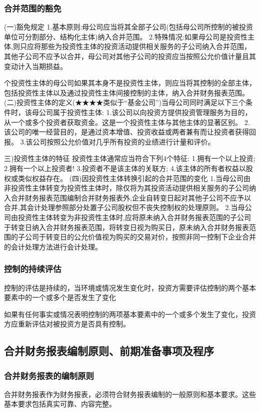 \documentclass[UTF8,12pt]{ctexart}
\numberwithin{equation}{section} %
\numberwithin{figure}{section}
\numberwithin{table}{section}
\begin{document}
	\subsubsection{合并范围的豁免}
	(一)豁免规定
	1.基本原则:母公司应当将其全部子公司(包括母公司所控制的被投资单位可分割部分、结构化主体)纳入合并范围。
	2.特殊情况:如果母公司是投资性主体,则只应将那些为投资性主体的投资活动提供相关服务的子公司纳入合并范围，其他子公司不应予以合并，母公司对其他子公司的投资应当按照公允价值计量且其变动计入当期损益。
	
	个投资性主体的母公司如果其本身不是投资性主体，则应当将其控制的全部主体，包括投资性主体以及通过投资性主体间接控制的主体，纳入合并财务报表范围。
	(二)投资性主体的定义(★★★★类似于“基金公司”)当母公司同时满足以下三个条件时，该母公司属于投资性主体:
	1.该公司以向投资方提供投资管理服务为目的，从一个或多个投资者获取资金。这是一个投资性主体与其他主体的显著区别。
	2.该公司的唯一经营目的，是通过资本增值、投资收益或两者兼有而让投资者获得回报。
	3.该公司按照公允价值对几乎所有投资的业绩进行计量和评价。
	
	三)投资性主体的特征
	投资性主体通常应当符合下列4个特征:
	1.拥有一个以上投资;
	2.拥有一个以上投资者!
	3.投资者不是该主体的关联方;
	4.该主体的所有者权益以股权或类似权益存在。
	(四)因投资性主体转换引起的合并范围的变化
	1.当母公司由非投资性主体转变为投资性主体时，除仅将为其投资活动提供相关服务的子公司纳入合并财务报表范围编制合并财务报表外,企业自转变日起对其他子公司不应予以合并,其会计处理参照部分处置子公司股权但不丧失控制权的处理原则。
	2.当母公司由投资性主体转变为非投资性主体时,应将原未纳入合并财务报表范围的子公司于转变日纳入合并财务报表范围，将转变日视为购买日，原未纳入合并财务报表范围的子公司于转变日的公允价值视为购买的交易对价，按照非同一控制下企业合并的会计处理方法进行会计处理。
	
	\subsubsection{控制的持续评估}
	控制的评估是持续的，当环境或情况发生变化时，投资方需要评估控制的两个基本要素中的一个或多个是否发生了变化
	
	如果有任何事实或情况表明控制的两项基本要素中的一个或多个发生了变化，投资方应重新评估对被投资方是否具有控制。
	
	\subsection{合并财务报表编制原则、前期准备事项及程序}
	\subsubsection{合并财务报表的编制原则}
	合并财务报表作为财务报表，必须符合财务报表编制的一般原则和基本要求。这些基本要求包括真实可靠、内容完整。
	
\end{document}
